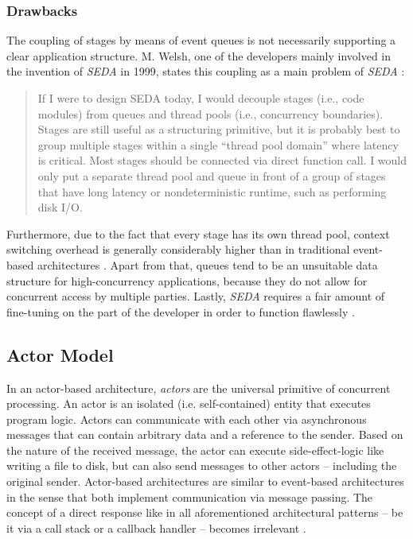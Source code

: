 \subsubsection*{Drawbacks}
The coupling of stages by means of event queues is not necessarily supporting a clear application structure. M. Welsh, one of the developers mainly involved in the invention of \textit{SEDA} in 1999, states this coupling as a main problem of \textit{SEDA} \cite{seda}: 

\begin{quote}
If I were to design SEDA today, I would decouple stages (i.e., code modules) from queues and thread pools (i.e., concurrency boundaries). Stages are still useful as a structuring primitive, but it is probably best to group multiple stages within a single ``thread pool domain'' where latency is critical. Most stages should be connected via direct function call. I would only put a separate thread pool and queue in front of a group of stages that have long latency or nondeterministic runtime, such as performing disk I/O.
\end{quote}

Furthermore, due to the fact that every stage has its own thread pool, context switching overhead is generally considerably higher than in traditional event-based architectures \cite{seda}. Apart from that, queues tend to be an unsuitable data structure for high-concurrency applications, because they do not allow for concurrent access by multiple parties. Lastly, \textit{SEDA} requires a fair amount of fine-tuning on the part of the developer in order to function flawlessly \cite{event-architecture}.

\subsection{Actor Model}
\label{lab:actormodel}
In an actor-based architecture, \textit{actors} are the universal primitive of concurrent processing. An actor is an isolated (i.e. self-contained) entity that executes program logic. Actors can communicate with each other via asynchronous messages that can contain arbitrary data and a reference to the sender. Based on the nature of the received message, the actor can execute side-effect-logic like writing a file to disk, but can also send messages to other actors -- including the original sender. Actor-based architectures are similar to event-based architectures in the sense that both implement communication via message passing. The concept of a direct response like in all aforementioned architectural patterns -- be it via a call stack or a callback handler -- becomes irrelevant \cite{Haller2006}. 

